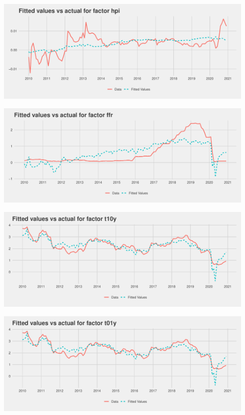 \documentclass[11pt, letterpaper]{article}\usepackage[]{graphicx}\usepackage[]{color}
\begin{document}
{\centering \includegraphics[width=5in,height=2in]{figure/unnamed-chunk-20-7} 

}




{\centering \includegraphics[width=5in,height=2in]{figure/unnamed-chunk-20-8} 

}




{\centering \includegraphics[width=5in,height=2in]{figure/unnamed-chunk-20-9} 

}




{\centering \includegraphics[width=5in,height=2in]{figure/unnamed-chunk-20-10} 

}
\end{document}
